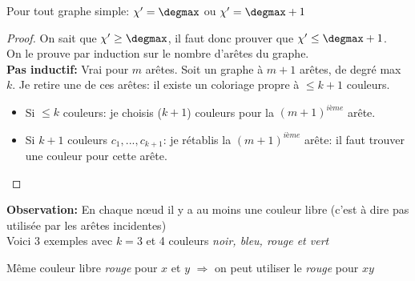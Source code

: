 \begin{mytheo} [Vizing]
Pour tout graphe simple: $\chi ' = \degmax$ ou  $\chi ' = \degmax + 1$
  \begin{proof} On sait que $\chi' \ge \degmax$, il faut donc prouver que $\chi ' \le \degmax + 1$.
  \\On le prouve par induction sur le nombre d'arêtes du graphe.
  \\ \textbf{Pas inductif:} Vrai pour $m$ arêtes. Soit un graphe à  $m+1$ arêtes, de degré max $k$. Je retire une de ces arêtes: il existe un coloriage propre à $\le k+1$ couleurs.
  \begin{itemize}
  \item Si $\le k$ couleurs: je choisis ($k+1$) couleurs pour la $(m+1)^{ième}$ arête.
  \item Si $k+1$ couleurs $c_{1},...,c_{k+1}$: je rétablis la $(m+1)^{ième}$ arête: il faut trouver une couleur pour cette arête.
  \end{itemize}

  \end{proof}
\end{mytheo}
\textbf{Observation:} En chaque nœud il y a au moins une couleur libre (c'est à dire pas utilisée par les arêtes incidentes)
\\
\newline Voici 3 exemples avec $k=3$ et 4 couleurs \emph{noir, bleu, rouge et vert}
\begin{myexem} \label{exemple1}
  Même couleur libre \emph{rouge} pour $x$ et $y$ $\Rightarrow$ on peut utiliser le \emph{rouge} pour $xy$
  \begin{figure}[H]
    \begin{center}
    \end{center}
  \end{figure}
\end{myexem}

